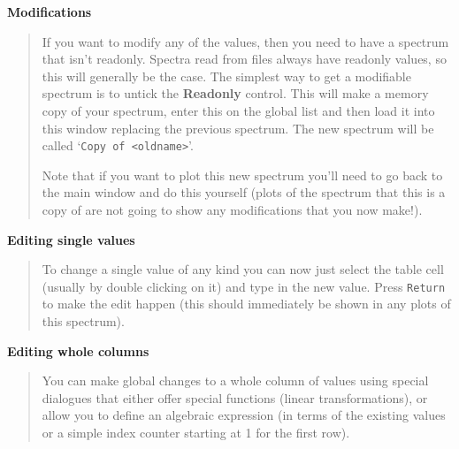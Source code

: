 \documentclass[twoside,11pt]{article}
\renewcommand{\_}{\texttt{\symbol{95}}}
\newcommand{\labelitem}[1]{\textbf{#1}}
\newcommand{\hitext}[1]{\texttt{#1}}
\newcommand{\subheading}[1]{\textbf{\large{#1}}}
\begin{document}
\subheading{Modifications}
\begin{quote}
 If you want to modify any of the values, then you need to have a
 spectrum that isn't readonly. Spectra read from files always have
 readonly values, so this will generally be the case. The simplest way
 to get a modifiable spectrum is to untick the \labelitem{Readonly}
 control. This will make a memory copy of your spectrum, enter this on
 the global list and then load it into this window replacing the
 previous spectrum. The new spectrum will be called
 `\hitext{Copy of <oldname>}'.

 Note that if you want to plot this new spectrum you'll need to go back
 to the main window and do this yourself (plots of the spectrum that
 this is a copy of are not going to show any modifications that you now
 make!).
\end{quote}

\subheading{Editing single values}
\begin{quote}
 To change a single value of any kind you can now just select the
 table cell (usually by double clicking on it) and type in the new
 value. Press \hitext{Return} to make the edit happen (this should
 immediately be shown in any plots of this spectrum).
\end{quote}

\subheading{Editing whole columns}
\begin{quote}
 You can make global changes to a whole column of values using special
 dialogues that either offer special functions (linear transformations),
 or allow you to define an algebraic expression (in terms of the
 existing values or a simple index counter starting at 1 for the first
 row).
\end{quote}
\end{document}
